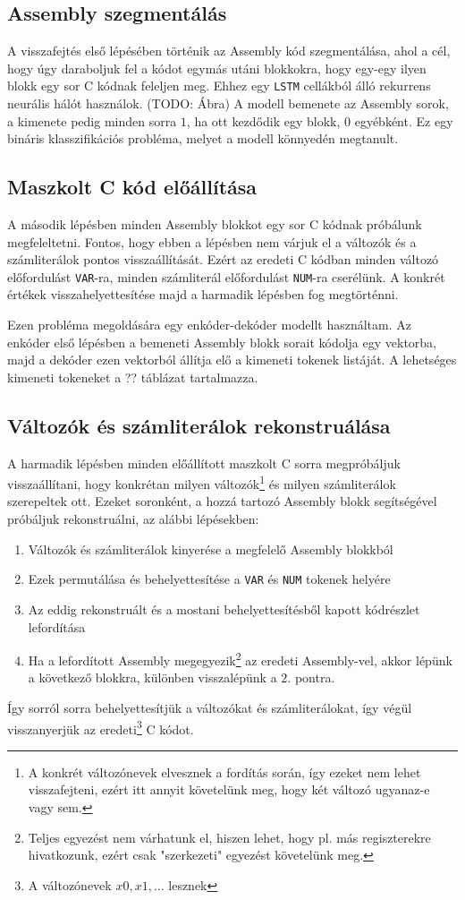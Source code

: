 \subsection{Assembly szegmentálás}
A visszafejtés első lépésében történik az Assembly kód szegmentálása, ahol
a cél, hogy úgy daraboljuk fel a kódot egymás utáni blokkokra, hogy egy-egy ilyen blokk egy
sor C kódnak feleljen meg. Ehhez egy \texttt{LSTM}\cite{??} cellákból álló
rekurrens neurális hálót használok. (TODO: Ábra) A modell bemenete az Assembly sorok,
a kimenete pedig minden sorra $1$, ha ott kezdődik egy blokk, $0$ egyébként. Ez
egy bináris klasszifikációs probléma, melyet a modell könnyedén megtanult.

\subsection{Maszkolt C kód előállítása}
A második lépésben minden Assembly blokkot egy sor C kódnak próbálunk
megfeleltetni. Fontos, hogy ebben a lépésben nem várjuk el a változók és
a számliterálok pontos visszaállítását. Ezért az eredeti C kódban minden
változó előfordulást \texttt{VAR}-ra, minden számliterál előfordulást
\texttt{NUM}-ra cserélünk. A konkrét értékek visszahelyettesítése majd
a harmadik lépésben fog megtörténni.

Ezen probléma megoldására egy enkóder-dekóder modellt használtam. Az enkóder
első lépésben a bemeneti Assembly blokk sorait kódolja egy vektorba, majd
a dekóder ezen vektorból állítja elő a kimeneti tokenek listáját. A lehetséges
kimeneti tokeneket a ?? táblázat tartalmazza.

\subsection{Változók és számliterálok rekonstruálása}
A harmadik lépésben minden előállított maszkolt C sorra megpróbáljuk
visszaállítani, hogy konkrétan milyen változók\footnote{A konkrét változónevek
elvesznek a fordítás során, így ezeket nem lehet visszafejteni, ezért itt
annyit követelünk meg, hogy két változó ugyanaz-e vagy sem.} és milyen
számliterálok szerepeltek ott. Ezeket soronként, a hozzá tartozó Assembly blokk
segítségével próbáljuk rekonstruálni, az alábbi lépésekben:
\begin{enumerate}
    \item Változók és számliterálok kinyerése a megfelelő Assembly blokkból
    \item Ezek permutálása és behelyettesítése a \texttt{VAR} és \texttt{NUM}
    tokenek helyére
    \item Az eddig rekonstruált és a mostani behelyettesítésből kapott kódrészlet lefordítása
    \item Ha a lefordított Assembly megegyezik\footnote{Teljes egyezést nem
    várhatunk el, hiszen lehet, hogy pl. más regiszterekre hivatkozunk, ezért
    csak "szerkezeti" egyezést követelünk meg.} az eredeti Assembly-vel, akkor
    lépünk a következő blokkra, különben visszalépünk a $2.$ pontra.
\end{enumerate}
Így sorról sorra behelyettesítjük a változókat és számliterálokat, így végül
visszanyerjük az eredeti\footnote{A változónevek $x0,x1,\dots$ lesznek}
C kódot.
